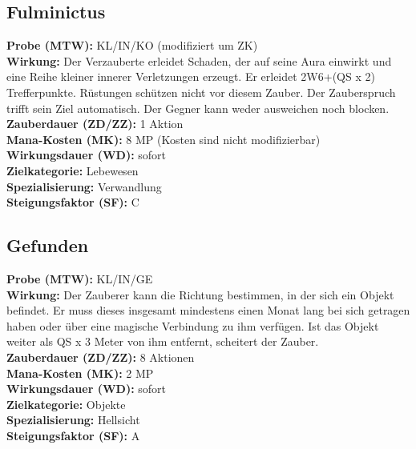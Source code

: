 \subsection{Fulminictus}
\label{chap:fulminictus}
\textbf{Probe (MTW):} KL/IN/KO (modifiziert um ZK) \\
\textbf{Wirkung:} Der Verzauberte erleidet Schaden, der auf seine Aura einwirkt und eine Reihe kleiner innerer Verletzungen erzeugt. Er erleidet 2W6+(QS x 2) Trefferpunkte. Rüstungen schützen nicht vor diesem Zauber. Der Zauberspruch trifft sein Ziel automatisch. Der Gegner kann weder ausweichen noch blocken. \\
\textbf{Zauberdauer (ZD/ZZ):} 1 Aktion \\
\textbf{Mana-Kosten (MK):} 8 MP (Kosten sind nicht modifizierbar) \\
\textbf{Wirkungsdauer (WD):} sofort \\
\textbf{Zielkategorie:} Lebewesen \\
\textbf{Spezialisierung:} Verwandlung \\
\textbf{Steigungsfaktor (SF):} C


\subsection{Gefunden}
\label{chap:gefunden}
\textbf{Probe (MTW):} KL/IN/GE \\
\textbf{Wirkung:} Der Zauberer kann die Richtung bestimmen, in der sich ein Objekt befindet. Er muss dieses insgesamt mindestens einen Monat lang bei sich getragen haben oder über eine magische Verbindung zu ihm verfügen. Ist das Objekt weiter als QS x 3 Meter von ihm entfernt, scheitert der Zauber.\\
\textbf{Zauberdauer (ZD/ZZ):} 8 Aktionen \\
\textbf{Mana-Kosten (MK):} 2 MP \\
\textbf{Wirkungsdauer (WD):} sofort \\
\textbf{Zielkategorie:} Objekte \\
\textbf{Spezialisierung:} Hellsicht \\
\textbf{Steigungsfaktor (SF):} A


